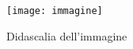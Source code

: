 \begin{figure}[H]
	\centering
	\texttt{[image: immagine]}
	\caption{Didascalia dell'immagine}
\end{figure}